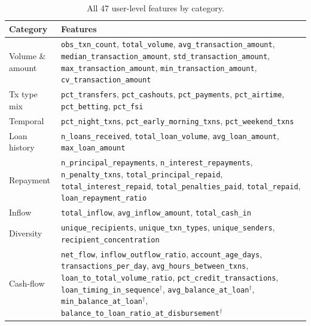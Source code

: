\documentclass{article}
\begin{document}
\begin{table}[h]
\caption{All 47 user-level features by category.}
\label{tab:features}
\vskip 0.05in
\begin{center}
\begin{scriptsize}
\begin{tabular}{p{2.0cm}p{12.0cm}}
\toprule
Category & Features \\
\midrule
Volume \& amount
  & \texttt{obs\_txn\_count}, \texttt{total\_volume},
    \texttt{avg\_transaction\_amount}, \texttt{median\_transaction\_amount},
    \texttt{std\_transaction\_amount}, \texttt{max\_transaction\_amount},
    \texttt{min\_transaction\_amount}, \texttt{cv\_transaction\_amount} \\
\addlinespace
Tx type mix
  & \texttt{pct\_transfers}, \texttt{pct\_cashouts},
    \texttt{pct\_payments}, \texttt{pct\_airtime},
    \texttt{pct\_betting}, \texttt{pct\_fsi} \\
\addlinespace
Temporal
  & \texttt{pct\_night\_txns},
    \texttt{pct\_early\_morning\_txns},
    \texttt{pct\_weekend\_txns} \\
\addlinespace
Loan history
  & \texttt{n\_loans\_received}, \texttt{total\_loan\_volume},
    \texttt{avg\_loan\_amount}, \texttt{max\_loan\_amount} \\
\addlinespace
Repayment
  & \texttt{n\_principal\_repayments}, \texttt{n\_interest\_repayments},
    \texttt{n\_penalty\_txns}, \texttt{total\_principal\_repaid},
    \texttt{total\_interest\_repaid}, \texttt{total\_penalties\_paid},
    \texttt{total\_repaid}, \texttt{loan\_repayment\_ratio} \\
\addlinespace
Inflow
  & \texttt{total\_inflow}, \texttt{avg\_inflow\_amount},
    \texttt{total\_cash\_in} \\
\addlinespace
Diversity
  & \texttt{unique\_recipients}, \texttt{unique\_txn\_types},
    \texttt{unique\_senders}, \texttt{recipient\_concentration} \\
\addlinespace
Cash-flow
  & \texttt{net\_flow}, \texttt{inflow\_outflow\_ratio},
    \texttt{account\_age\_days}, \texttt{transactions\_per\_day},
    \texttt{avg\_hours\_between\_txns}, \texttt{loan\_to\_total\_volume\_ratio},
    \texttt{pct\_credit\_transactions},
    \texttt{loan\_timing\_in\_sequence}$^\dag$,
    \texttt{avg\_balance\_at\_loan}$^\dag$,
    \texttt{min\_balance\_at\_loan}$^\dag$,
    \texttt{balance\_to\_loan\_ratio\_at\_disbursement}$^\dag$ \\
\bottomrule
\end{tabular}
\end{scriptsize}
\end{center}
\vskip -0.1in
\end{table}
\end{document}
